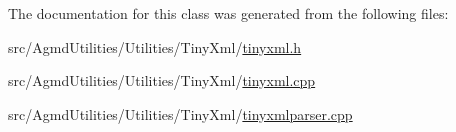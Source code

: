 The documentation for this class was generated from the following files\+:\begin{DoxyCompactItemize}
\item 
src/\+Agmd\+Utilities/\+Utilities/\+Tiny\+Xml/\hyperlink{tinyxml_8h}{tinyxml.\+h}\item 
src/\+Agmd\+Utilities/\+Utilities/\+Tiny\+Xml/\hyperlink{tinyxml_8cpp}{tinyxml.\+cpp}\item 
src/\+Agmd\+Utilities/\+Utilities/\+Tiny\+Xml/\hyperlink{tinyxmlparser_8cpp}{tinyxmlparser.\+cpp}\end{DoxyCompactItemize}
